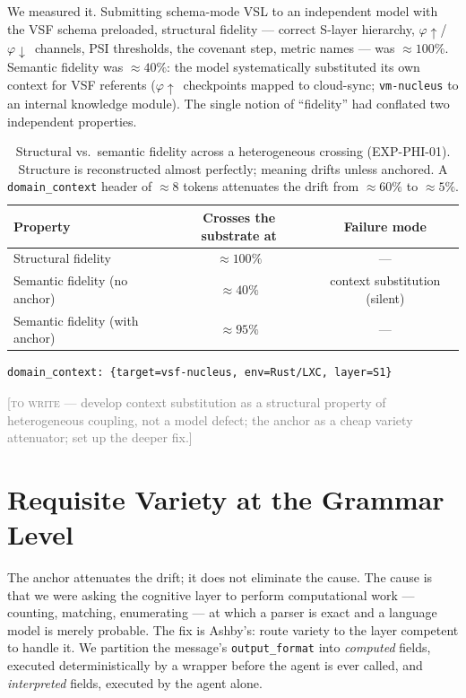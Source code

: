 \documentclass[12pt]{article}
\newcommand{\phiup}{\ensuremath{\varphi\!\uparrow}}
\newcommand{\phidown}{\ensuremath{\varphi\!\downarrow}}
\newcommand{\TODO}[1]{\medskip\noindent\textcolor{gray}{\small[\textsc{to write} --- #1]}\medskip}
\begin{document}
We measured it. Submitting schema-mode VSL to an independent model with the VSF schema
preloaded, structural fidelity --- correct S-layer hierarchy, \phiup/\phidown\ channels,
PSI thresholds, the covenant step, metric names --- was $\approx 100\%$. Semantic
fidelity was $\approx 40\%$: the model systematically substituted its own context for
VSF referents (\phiup\ checkpoints mapped to cloud-sync; \texttt{vm-nucleus} to an
internal knowledge module). The single notion of ``fidelity'' had conflated two
independent properties.

\begin{table}[!htb]
\centering
\begin{tabular}{lcc}
\toprule
Property & Crosses the substrate at & Failure mode \\
\midrule
Structural fidelity & $\approx 100\%$ & --- \\
Semantic fidelity (no anchor)   & $\approx 40\%$ & context substitution (silent) \\
Semantic fidelity (with anchor) & $\approx 95\%$ & --- \\
\bottomrule
\end{tabular}
\caption{Structural vs.\ semantic fidelity across a heterogeneous crossing
(EXP-PHI-01). Structure is reconstructed almost perfectly; meaning drifts unless
anchored. A \texttt{domain\_context} header of $\approx 8$ tokens attenuates the drift
from $\approx 60\%$ to $\approx 5\%$.}
\label{tab:drift}
\end{table}

\begin{lstlisting}
domain_context: {target=vsf-nucleus, env=Rust/LXC, layer=S1}
\end{lstlisting}

\TODO{develop context substitution as a structural property of heterogeneous coupling,
not a model defect; the anchor as a cheap variety attenuator; set up the deeper fix.}

\section{Requisite Variety at the Grammar Level}
\label{sec:ashby}

The anchor attenuates the drift; it does not eliminate the cause. The cause is that we
were asking the cognitive layer to perform computational work --- counting, matching,
enumerating --- at which a parser is exact and a language model is merely probable. The
fix is Ashby's: route variety to the layer competent to handle it. We partition the
message's \texttt{output\_format} into \emph{computed} fields, executed deterministically
by a wrapper before the agent is ever called, and \emph{interpreted} fields, executed by
the agent alone.
\end{document}
